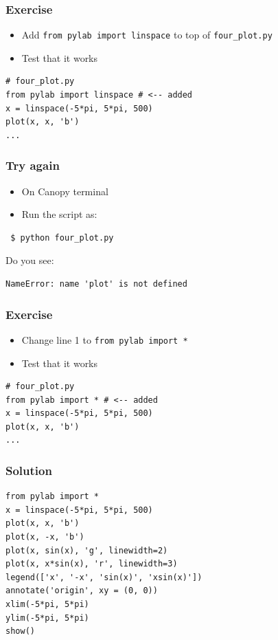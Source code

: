 \documentclass[14pt,compress]{beamer}
\newcounter{time}
\newcommand{\inctime}[1]{\addtocounter{time}{#1}{\tiny \thetime\ m}}
\newcommand{\typ}[1]{\lstinline{#1}}
\begin{document}
\begin{frame}[fragile]
  \frametitle{Exercise}
  \begin{itemize}
  \item Add \typ{from pylab import linspace} to top of \typ{four_plot.py}
  \item Test that it works
  \end{itemize}
\begin{lstlisting}
# four_plot.py
from pylab import linspace # <-- added
x = linspace(-5*pi, 5*pi, 500)
plot(x, x, 'b')
...
\end{lstlisting}
\end{frame}

\begin{frame}[fragile]
  \frametitle{Try again}
  \begin{itemize}
  \item On Canopy terminal
  \item Run the script as:
  \end{itemize}
\begin{lstlisting}
 $ python four_plot.py
\end{lstlisting}
  \pause
  \vspace*{0.15in}
  Do you see:
  \begin{small}
\begin{lstlisting}
NameError: name 'plot' is not defined
\end{lstlisting}
  \end{small}
\end{frame}

\begin{frame}[fragile]
  \frametitle{Exercise}
  \begin{itemize}
  \item Change line 1 to \typ{from pylab import *}
  \item Test that it works
  \end{itemize}
\begin{lstlisting}
# four_plot.py
from pylab import * # <-- added
x = linspace(-5*pi, 5*pi, 500)
plot(x, x, 'b')
...
\end{lstlisting}
\inctime{5}
\end{frame}

\begin{frame}[fragile]
  \frametitle{Solution}
  \small
\begin{lstlisting}
from pylab import *
x = linspace(-5*pi, 5*pi, 500)
plot(x, x, 'b')
plot(x, -x, 'b')
plot(x, sin(x), 'g', linewidth=2)
plot(x, x*sin(x), 'r', linewidth=3)
legend(['x', '-x', 'sin(x)', 'xsin(x)'])
annotate('origin', xy = (0, 0))
xlim(-5*pi, 5*pi)
ylim(-5*pi, 5*pi)
show()
\end{lstlisting}
\end{frame}
\end{document}
